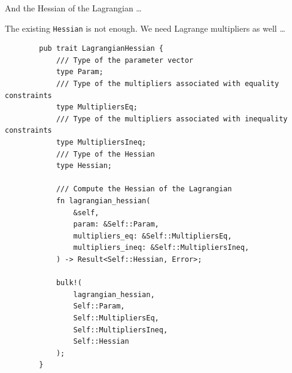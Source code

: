 \documentclass{beamer}
\begin{document}
\begin{frame}[fragile]{And the Hessian of the Lagrangian \dots}

  \tiny
  The existing \texttt{Hessian} is not enough. We need Lagrange multipliers as well \dots

  \begin{listing}
    \begin{verbatim}
        pub trait LagrangianHessian {
            /// Type of the parameter vector
            type Param;
            /// Type of the multipliers associated with equality constraints
            type MultipliersEq;
            /// Type of the multipliers associated with inequality constraints
            type MultipliersIneq;
            /// Type of the Hessian
            type Hessian;

            /// Compute the Hessian of the Lagrangian
            fn lagrangian_hessian(
                &self,
                param: &Self::Param,
                multipliers_eq: &Self::MultipliersEq,
                multipliers_ineq: &Self::MultipliersIneq,
            ) -> Result<Self::Hessian, Error>;

            bulk!(
                lagrangian_hessian,
                Self::Param,
                Self::MultipliersEq,
                Self::MultipliersIneq,
                Self::Hessian
            );
        }
    \end{verbatim}
  \end{listing}

\end{frame}
\end{document}
